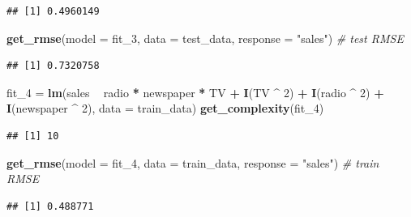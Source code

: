 \documentclass[]{report}
\newenvironment{Shaded}{\begin{snugshade}}{\end{snugshade}}
\newcommand{\KeywordTok}[1]{\textcolor[rgb]{0.13,0.29,0.53}{\textbf{#1}}}
\newcommand{\DataTypeTok}[1]{\textcolor[rgb]{0.13,0.29,0.53}{#1}}
\newcommand{\DecValTok}[1]{\textcolor[rgb]{0.00,0.00,0.81}{#1}}
\newcommand{\StringTok}[1]{\textcolor[rgb]{0.31,0.60,0.02}{#1}}
\newcommand{\CommentTok}[1]{\textcolor[rgb]{0.56,0.35,0.01}{\textit{#1}}}
\newcommand{\OperatorTok}[1]{\textcolor[rgb]{0.81,0.36,0.00}{\textbf{#1}}}
\newcommand{\NormalTok}[1]{#1}
\begin{document}
\begin{verbatim}
## [1] 0.4960149
\end{verbatim}

\begin{Shaded}
\begin{Highlighting}[]
\KeywordTok{get_rmse}\NormalTok{(}\DataTypeTok{model =}\NormalTok{ fit_}\DecValTok{3}\NormalTok{, }\DataTypeTok{data =}\NormalTok{ test_data, }\DataTypeTok{response =} \StringTok{"sales"}\NormalTok{) }\CommentTok{# test RMSE}
\end{Highlighting}
\end{Shaded}

\begin{verbatim}
## [1] 0.7320758
\end{verbatim}

\begin{Shaded}
\begin{Highlighting}[]
\NormalTok{fit_}\DecValTok{4}\NormalTok{ =}\StringTok{ }\KeywordTok{lm}\NormalTok{(sales }\OperatorTok{~}\StringTok{ }\NormalTok{radio }\OperatorTok{*}\StringTok{ }\NormalTok{newspaper }\OperatorTok{*}\StringTok{ }\NormalTok{TV }\OperatorTok{+}\StringTok{ }
\StringTok{           }\KeywordTok{I}\NormalTok{(TV }\OperatorTok{^}\StringTok{ }\DecValTok{2}\NormalTok{) }\OperatorTok{+}\StringTok{ }\KeywordTok{I}\NormalTok{(radio }\OperatorTok{^}\StringTok{ }\DecValTok{2}\NormalTok{) }\OperatorTok{+}\StringTok{ }\KeywordTok{I}\NormalTok{(newspaper }\OperatorTok{^}\StringTok{ }\DecValTok{2}\NormalTok{), }\DataTypeTok{data =}\NormalTok{ train_data)}
\KeywordTok{get_complexity}\NormalTok{(fit_}\DecValTok{4}\NormalTok{)}
\end{Highlighting}
\end{Shaded}

\begin{verbatim}
## [1] 10
\end{verbatim}

\begin{Shaded}
\begin{Highlighting}[]
\KeywordTok{get_rmse}\NormalTok{(}\DataTypeTok{model =}\NormalTok{ fit_}\DecValTok{4}\NormalTok{, }\DataTypeTok{data =}\NormalTok{ train_data, }\DataTypeTok{response =} \StringTok{"sales"}\NormalTok{) }\CommentTok{# train RMSE}
\end{Highlighting}
\end{Shaded}

\begin{verbatim}
## [1] 0.488771
\end{verbatim}
\end{document}
